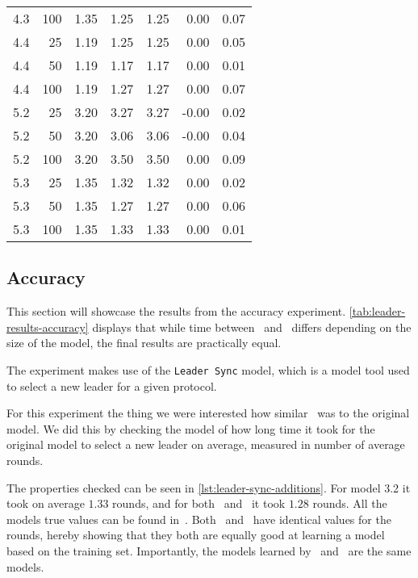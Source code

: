 \begin{table}[htb!]
\begin{tabular}{rrrrrrr}
        4.3           & 100   & 1.35   & 1.25    & 1.25    & 0.00     & 0.07   \\
        4.4           & 25    & 1.19   & 1.25    & 1.25    & 0.00     & 0.05   \\
        4.4           & 50    & 1.19   & 1.17    & 1.17    & 0.00     & 0.01   \\
        4.4           & 100   & 1.19   & 1.27    & 1.27    & 0.00     & 0.07   \\
        5.2           & 25    & 3.20   & 3.27    & 3.27    & -0.00    & 0.02   \\
        5.2           & 50    & 3.20   & 3.06    & 3.06    & -0.00    & 0.04   \\
        5.2           & 100   & 3.20   & 3.50    & 3.50    & 0.00     & 0.09   \\
        5.3           & 25    & 1.35   & 1.32    & 1.32    & 0.00     & 0.02   \\
        5.3           & 50    & 1.35   & 1.27    & 1.27    & 0.00     & 0.06   \\
        5.3           & 100   & 1.35   & 1.33    & 1.33    & 0.00     & 0.01   \\
        \bottomrule
    \end{tabular}
\end{table}


\subsection{Accuracy}\label{subsec:accuracy}
This section will showcase the results from the accuracy experiment.
\autoref{tab:leader-results-accuracy} displays that while time between \Cupaal\ and \Jajapy\ differs depending on the size of the model, the final results are practically equal.

The experiment makes use of the \texttt{Leader Sync} model, which is a model tool used to select a new leader for a given protocol.

For this experiment the thing we were interested how similar \Cupaal\ was to the original model.
We did this by checking the model of how long time it took for the original model to select a new leader on average, measured in number of average rounds.

The properties checked can be seen in \autoref{lst:leader-sync-additions}.
For model 3.2 it took on average $1.33$ rounds, and for both \Cupaal\ and \Jajapy\ it took $1.28$ rounds.
All the models true values can be found in~\cite{kwiatkowska2012prism}.
Both \Cupaal\ and \Jajapy\ have identical values for the rounds, hereby showing that they both are equally good at learning a model based on the training set.
Importantly, the models learned by \Cupaal\ and \Jajapy\ are the same models.

